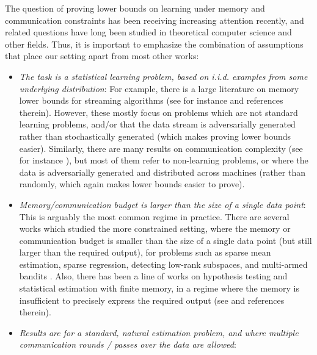 \documentclass[final, 12pt]{colt2018}
\begin{document}
The question of proving lower bounds on learning under memory and communication 
constraints has been receiving increasing attention recently, and related 
questions have long been studied in theoretical computer science and other 
fields. Thus, it is important to emphasize the combination of assumptions that 
place our setting apart from most other works:
\begin{itemize}[leftmargin=*]
	\item \emph{The task is a statistical learning problem, based on  
	i.i.d. examples from some underlying distribution}: For example, there is a 
	large literature on memory lower bounds for streaming algorithms (see for 
	instance \citet{alon1996space, bar2002information, muthukrishnan2005data} and 
	references therein). However, these mostly focus on 
	problems which are not standard learning problems, and/or that the data 
	stream is adversarially generated rather than stochastically generated 
	(which makes proving lower bounds easier). Similarly, there are many results on communication complexity (see for instance \citet{KuNi97}), but most of them refer to non-learning problems, or where the data is adversarially generated and distributed across machines (rather than randomly, which again makes lower bounds easier to prove).
	\item \emph{Memory/communication budget is larger than the size of a single 
	data point}: This is arguably the most common regime in practice. There are several works which studied the more constrained setting, where the memory or 
	communication budget is smaller than the size of a single data point (but 
	still larger than the required output), for 
	problems such as sparse mean estimation, sparse regression, detecting 
	low-rank subspaces, and multi-armed bandits	\citep{shamir2014fundamental,steinhardt2015minimax,crouch2016stochastic,braverman2016communication}. 
	 Also, there has been a line 
	of works on hypothesis testing and statistical
	estimation with finite memory, in a regime where the memory is insufficient 
	to precisely express the required output (see \cite{hellman1970learning,leighton1986estimating,ertin2003sequential,kontorovich2012statistical} and references therein). 
	\item \emph{Results are for a standard, natural estimation problem, and where 
	multiple communication rounds / passes over the data are allowed}: 

\end{itemize}
\end{document}
